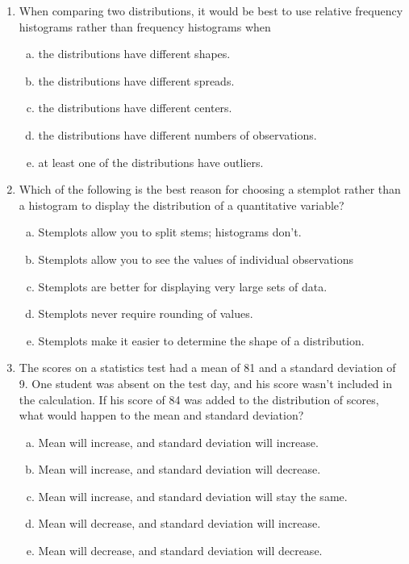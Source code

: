 \documentclass[a4paper,12pt,twoside]{book}
\begin{document}
\begin{itemize}
\begin{enumerate}
 \item When comparing two distributions, it would be best to use relative frequency histograms rather than frequency histograms when 
   \begin{enumerate}[(a), start =1]
   \item the distributions have different shapes.
   \item the distributions have different spreads.
   \item the distributions have different centers.
   \item the distributions have different numbers of observations.
   \item at least one of the distributions have outliers.   
   \end{enumerate}
   \vspace{0.3cm}
   
  \item Which of the following is the best reason for choosing a stemplot rather than a histogram to display the distribution of a quantitative variable?
  
    \begin{enumerate}[(a), start = 1]
      \item Stemplots allow you to split stems; histograms don’t.
      \item Stemplots allow you to see the values of individual  observations
      \item Stemplots are better for displaying very large sets of data.
      \item Stemplots never require rounding of values.
      \item Stemplots make it easier to determine the shape of a distribution.
    \end{enumerate}
    \vspace{0.3cm}
     
   \item The scores on a statistics test had a mean of 81 and a standard deviation of 9. One student was absent on the test day, and his score wasn’t included in the calculation. If his score of 84 was added to the distribution of scores, what would happen to the mean and standard deviation?
   
     \begin{enumerate}[(a), start = 1]
       \item Mean will increase, and standard deviation will increase.
       \item Mean will increase, and standard deviation will decrease.
       \item Mean will increase, and standard deviation will stay the same.
       \item Mean will decrease, and standard deviation will increase.
       \item Mean will decrease, and standard deviation will decrease.
     \end{enumerate}
     \vspace{0.3cm}
     

\end{enumerate}
\end{itemize}
\end{document}
